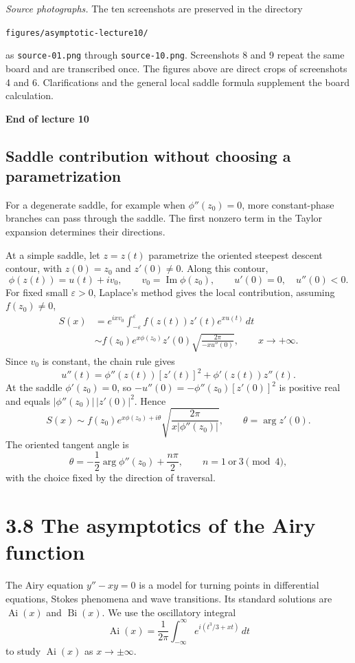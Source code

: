 \documentclass[11pt,a4paper]{article}
\begin{document}
\medskip
\noindent\textit{Source photographs.}
The ten screenshots are preserved in the directory
\begin{center}
    \texttt{figures/asymptotic-lecture10/}
\end{center}
as \texttt{source-01.png} through \texttt{source-10.png}.
Screenshots 8 and 9 repeat the same board and
are transcribed once. The figures above are direct crops of screenshots
4 and 6. Clarifications and the general local saddle formula supplement
the board calculation.

\begin{center}
    \textbf{End of lecture 10}
\end{center}

\clearpage
\subsection*{Saddle contribution without choosing a parametrization}
For a degenerate saddle, for example when $\phi''(z_0)=0$, more
constant-phase branches can pass through the saddle. The first
nonzero term in the Taylor expansion determines their directions.

At a simple saddle, let $z=z(t)$ parametrize the oriented steepest
descent contour, with $z(0)=z_0$ and $z'(0)\neq0$. Along this contour,
\[
    \phi(z(t))=u(t)+iv_0,\qquad v_0=\operatorname{Im}\phi(z_0),
    \qquad u'(0)=0,\quad u''(0)<0.
\]
For fixed small $\varepsilon>0$, Laplace's method gives the local
contribution, assuming $f(z_0)\neq0$,
\begin{align*}
    S(x)
    &=e^{ixv_0}\int_{-\varepsilon}^{\varepsilon}
        f(z(t))z'(t)e^{xu(t)}\,dt\\
    &\sim f(z_0)e^{x\phi(z_0)}z'(0)\sqrt{\frac{2\pi}{-xu''(0)}},
    \qquad x\to+\infty.
\end{align*}
Since $v_0$ is constant, the chain rule gives
\[
    u''(t)=\phi''(z(t))[z'(t)]^2+\phi'(z(t))z''(t).
\]
At the saddle $\phi'(z_0)=0$, so $-u''(0)=-\phi''(z_0)[z'(0)]^2$
is positive real and equals $|\phi''(z_0)|\,|z'(0)|^2$. Hence
\[
    \boxed{S(x)\sim f(z_0)e^{x\phi(z_0)+i\theta}
        \sqrt{\frac{2\pi}{x|\phi''(z_0)|}}},
    \qquad \theta=\arg z'(0).
\]
The oriented tangent angle is
\[
    \theta=-\frac12\arg\phi''(z_0)+\frac{n\pi}{2},
    \qquad n=1\ \text{or}\ 3\pmod 4,
\]
with the choice fixed by the direction of traversal.

\clearpage
\section*{3.8 The asymptotics of the Airy function}
The Airy equation $y''-xy=0$ is a model for turning points in
differential equations, Stokes phenomena and wave transitions.
Its standard solutions are $\operatorname{Ai}(x)$ and
$\operatorname{Bi}(x)$. We use the oscillatory integral
\[
    \operatorname{Ai}(x)=\frac{1}{2\pi}
        \int_{-\infty}^{\infty} e^{i(t^3/3+xt)}\,dt
\]
to study $\operatorname{Ai}(x)$ as $x\to\pm\infty$.
\end{document}
